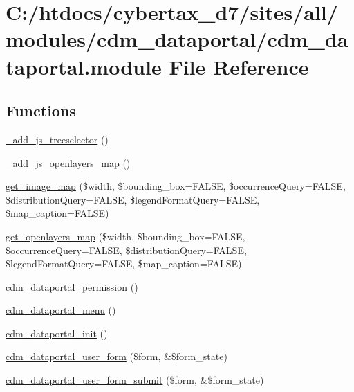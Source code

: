 \hypertarget{cdm__dataportal_8module}{\section{C\-:/htdocs/cybertax\-\_\-d7/sites/all/modules/cdm\-\_\-dataportal/cdm\-\_\-dataportal.module File Reference}
\label{cdm__dataportal_8module}
}
\subsection*{Functions}
\begin{DoxyCompactItemize}
\item 
\hyperlink{cdm__dataportal_8module_a0b938b1e2183e37a8451f0026dd747ca}{\-\_\-add\-\_\-js\-\_\-treeselector} ()
\item 
\hyperlink{cdm__dataportal_8module_a80429b3904db0106782a1325c422d5f1}{\-\_\-add\-\_\-js\-\_\-openlayers\-\_\-map} ()
\item 
\hyperlink{cdm__dataportal_8module_aec4031172fa270d60139e31b20a26e88}{get\-\_\-image\-\_\-map} (\$width, \$bounding\-\_\-box=F\-A\-L\-S\-E, \$occurrence\-Query=F\-A\-L\-S\-E, \$distribution\-Query=F\-A\-L\-S\-E, \$legend\-Format\-Query=F\-A\-L\-S\-E, \$map\-\_\-caption=F\-A\-L\-S\-E)
\item 
\hyperlink{cdm__dataportal_8module_a2fb20f5f8f5bbbfbc56513b318ad0c9d}{get\-\_\-openlayers\-\_\-map} (\$width, \$bounding\-\_\-box=F\-A\-L\-S\-E, \$occurrence\-Query=F\-A\-L\-S\-E, \$distribution\-Query=F\-A\-L\-S\-E, \$legend\-Format\-Query=F\-A\-L\-S\-E, \$map\-\_\-caption=F\-A\-L\-S\-E)
\item 
\hyperlink{cdm__dataportal_8module_a4aa35b5eba21d9232efdb93c72572069}{cdm\-\_\-dataportal\-\_\-permission} ()
\item 
\hyperlink{cdm__dataportal_8module_a8a651faded974a38c574caec9ec03745}{cdm\-\_\-dataportal\-\_\-menu} ()
\item 
\hyperlink{cdm__dataportal_8module_a5b236ce305a496326db64d51307910ef}{cdm\-\_\-dataportal\-\_\-init} ()
\item 
\hyperlink{cdm__dataportal_8module_adc3ab3565b0c030a2078c454d4480a75}{cdm\-\_\-dataportal\-\_\-user\-\_\-form} (\$form, \&\$form\-\_\-state)
\item 
\hyperlink{cdm__dataportal_8module_a5f076461168ea308bb5ea5d444a7e26c}{cdm\-\_\-dataportal\-\_\-user\-\_\-form\-\_\-submit} (\$form, \&\$form\-\_\-state)

\end{DoxyCompactItemize}
